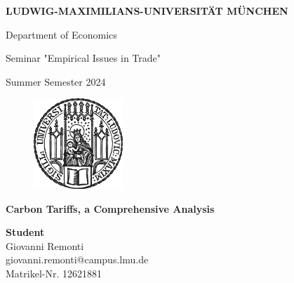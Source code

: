 \begin{titlepage}

\begin{center}
    {\large \uppercase{\textbf{Ludwig-Maximilians-Universität München}}}

    \vspace{0.5cm}
    
    {\Large Department of Economics}
    
    \vspace{0.5cm}

    {\Large Seminar "Empirical Issues in Trade"}

    \vspace{0.5cm}

    {\Large Summer Semester 2024}
\end{center}

\vspace{0.7cm}

\begin{figure}[h]
    \centering
    \includegraphics[width=95pt]{img/lmu-logo.png}
\end{figure}

\begin{center}
    {\Large \textbf{Carbon Tariffs, a Comprehensive Analysis}\par}
\end{center}

\vfill

\noindent\large \textbf{Student}\\
\large Giovanni Remonti\\
\large giovanni.remonti@campus.lmu.de\\
\large Matrikel-Nr. 12621881

\end{titlepage}